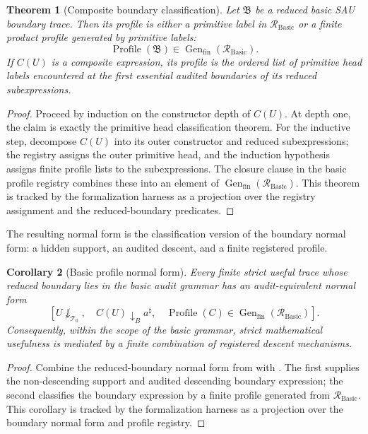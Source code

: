 \documentclass[11pt]{article}
\newcommand{\Prof}{\operatorname{Profile}}
\newcommand{\Basic}{\operatorname{Basic}}
\newcommand{\Gen}{\operatorname{Gen}}
\newtheorem{theorem}{Theorem}[section]
\newtheorem{corollary}[theorem]{Corollary}
\theoremstyle{definition}
\begin{document}
\begin{theorem}[Composite boundary classification]
\label{thm:sau-composite-boundary-classification}
Let \(\mathfrak B\) be a reduced basic SAU boundary trace.  Then its profile is either a primitive label in \(\mathcal R_{\Basic}\) or a finite product profile generated by primitive labels:
\[
\Prof(\mathfrak B)\in \Gen_{\mathrm{fin}}(\mathcal R_{\Basic}).
\]
If \(C(U)\) is a composite expression, its profile is the ordered list of primitive head labels encountered at the first essential audited boundaries of its reduced subexpressions.
\end{theorem}

\begin{proof}
Proceed by induction on the constructor depth of \(C(U)\).  At depth one, the
claim is exactly the primitive head classification theorem.  For the inductive
step, decompose \(C(U)\) into its outer constructor and reduced subexpressions;
the registry assigns the outer primitive head, and the induction hypothesis
assigns finite profile lists to the subexpressions.  The closure clause in the
basic profile registry combines these into an element of
\(\Gen_{\mathrm{fin}}(\mathcal R_{\Basic})\).  This theorem is tracked by the
formalization harness as a projection over the registry assignment and the
reduced-boundary predicates.
\end{proof}

The resulting normal form is the classification version of the boundary normal
form: a hidden support, an audited descent, and a finite registered profile.

\begin{corollary}[Basic profile normal form]
\label{cor:sau-basic-profile-normal-form}
Every finite strict useful trace whose reduced boundary lies in the basic audit grammar has an audit-equivalent normal form
\[
\left[U\not\downarrow_{\mathcal T_0},
\quad
C(U)\downarrow_B a^\sharp,
\quad
\Prof(C)\in\Gen_{\mathrm{fin}}(\mathcal R_{\Basic})
\right].
\]
Consequently, within the scope of the basic grammar, strict mathematical usefulness is mediated by a finite combination of registered descent mechanisms.
\end{corollary}

\begin{proof}
Combine the reduced-boundary normal form from  with
.  The first supplies the
non-descending support and audited descending boundary expression; the second
classifies the boundary expression by a finite profile generated from
\(\mathcal R_{\Basic}\).  This corollary is tracked by the formalization harness
as a projection over the boundary normal form and profile registry.
\end{proof}
\end{document}
